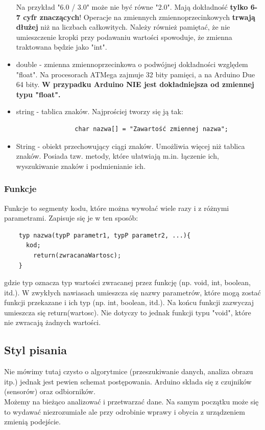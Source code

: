\documentclass[a4paper,12pt, twoside]{article}
\begin{document}
\begin{itemize}
				Na przykład "6.0 / 3.0" może nie być równe "2.0". Mają dokładność \textbf{tylko 6-7 cyfr znaczących}! Operacje na zmiennych zmiennoprzecinkowych \textbf{trwają dłużej} niż na liczbach całkowitych.
				Należy również pamiętać, że nie umieszczenie kropki przy podawaniu wartości spowoduje, że zmienna traktowana będzie jako "int".
			\item double - zmienna zmiennoprzecinkowa o podwójnej dokładności względem "float". Na procesorach ATMega zajmuje 32 bity pamięci, a na Arduino Due 64 bity.
				\textbf{W przypadku Arduino NIE jest dokładniejsza od zmiennej typu "float".}
			\item string - tablica znaków. Najprościej tworzy się ją tak:
				\begin{verbatim}
				char nazwa[] = "Zawartość zmiennej nazwa";
				\end{verbatim}
			\item String - obiekt przechowujący ciągi znaków. Umożliwia więcej niż tablica znaków. Posiada tzw. metody, które ułatwiają m.in. łączenie ich, wyszukiwanie znaków i podmienianie ich.
		\end{itemize}
	
\subsubsection{Funkcje}
	Funkcje to segmenty kodu, które można wywołać wiele razy i z różnymi parametrami.
	Zapisuje się je w ten sposób:
	\begin{verbatim}
	typ nazwa(typP parametr1, typP parametr2, ...){
	  kod;
		return(zwracanaWartosc);
	}
	\end{verbatim}
	gdzie typ oznacza typ wartości zwracanej przez funkcję (np. void, int, boolean, itd.).
	W zwykłych nawiasach umieszcza się nazwy parametrów, które mogą zostać funkcji przekazane i ich typ (np. int, boolean, itd.). Na końcu funkcji zazwyczaj umieszcza się return(wartosc). Nie dotyczy to jednak funkcji typu "void", które nie zwracają żadnych wartości.


	\subsection {Styl pisania}
	Nie mówimy tutaj czysto o algorytmice (przeszukiwanie danych, analiza obrazu itp.) jednak jest pewien schemat postępowania. Arduino składa się z czujników (sensorów) oraz odbiorników. %
	\\
	Możemy  na bieżąco analizować i przetwarzać dane. Na samym początku może się to wydawać niezrozumiałe ale przy odrobinie wprawy i obycia z urządzeniem zmienią podejście.
		
\end{document}
